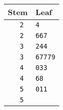 \begin{tabular}{r|l}
  Stem & Leaf\\
  \hline
  \tt 2 & \tt 4\\
  \tt 2 & \tt 667\\
  \tt 3 & \tt 244\\
  \tt 3 & \tt 67779\\
  \tt 4 & \tt 033\\
  \tt 4 & \tt 68\\
  \tt 5 & \tt 011\\
  \tt 5 & \\
\end{tabular}
  
